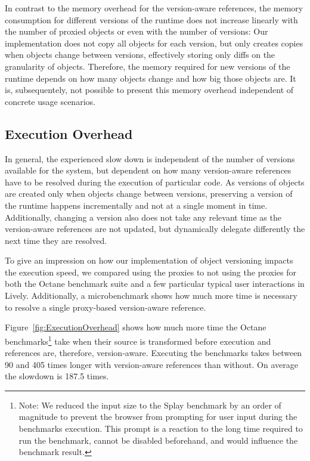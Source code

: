 In contrast to the memory overhead for the version-aware references, the memory consumption for different versions of the runtime does not increase linearly with the number of proxied objects or even with the number of versions:
Our implementation does not copy all objects for each version, but only creates copies when objects change between versions, effectively storing only diffs on the granularity of objects.
Therefore, the memory required for new versions of the runtime depends on how many objects change and how big those objects are.
It is, subsequentely, not possible to present this memory overhead independent of concrete usage scenarios.


\subsection{Execution Overhead}

In general, the experienced slow down is independent of the number of versions available for the system, but dependent on how many version-aware references have to be resolved during the execution of particular code.
As versions of objects are created only when objects change between versions, preserving a version of the runtime happens incrementally and not at a single moment in time.
Additionally, changing a version also does not take any relevant time as the version-aware references are not updated, but dynamically delegate differently the next time they are resolved.

To give an impression on how our implementation of object versioning impacts the execution speed, we compared using the proxies to not using the proxies for both the Octane benchmark suite and a few particular typical user interactions in Lively.
Additionally, a microbenchmark shows how much more time is necessary to resolve a single proxy-based version-aware reference.

Figure~\ref{fig:ExecutionOverhead} shows how much more time the Octane benchmarks\footnote{Note: We reduced the input size to the Splay benchmark by an order of magnitude to prevent the browser from prompting for user input during the benchmarks execution. This prompt is a reaction to the long time required to run the benchmark, cannot be disabled beforehand, and would influence the benchmark result.} take when their source is transformed before execution and references are, therefore, version-aware.
Executing the benchmarks takes between 90 and 405 times longer with version-aware references than without.
On average the slowdown is 187.5 times.

